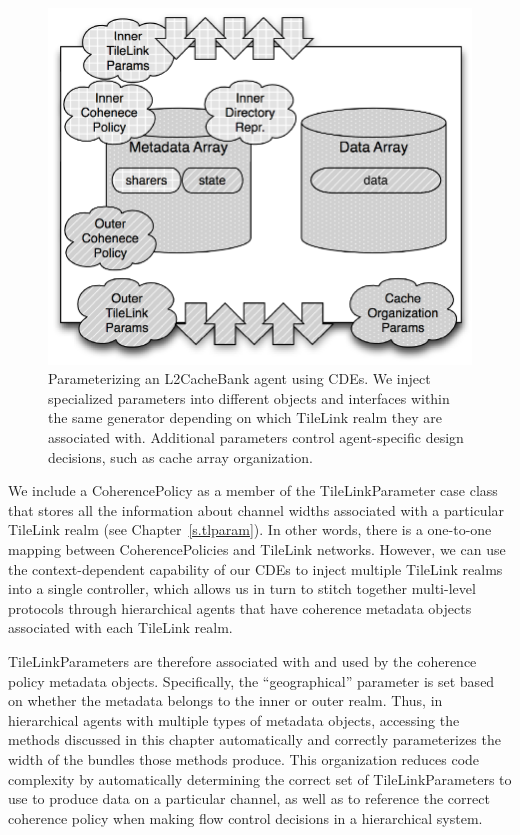 \begin{figure}[t!]
\centering
\includegraphics[width=1\columnwidth]{coherence/figures/cdepolicy.pdf}
\caption[Parameterizing coherence protocol agents with CoherencePolicies.]{
Parameterizing an L2CacheBank agent using CDEs.
We inject specialized parameters into different
objects and interfaces within the same generator depending on which
TileLink realm they are associated with.
Additional parameters control agent-specific design decisions, such as cache array organization.
}
\label{fig:cdepolicy}
\end{figure}

We include a CoherencePolicy as a member of the TileLinkParameter case class that stores all the information
about channel widths associated with a particular TileLink realm (see Chapter~\ref{s.tlparam}).
In other words, there is a one-to-one mapping between CoherencePolicies and TileLink networks.
However, we can use the context-dependent capability of our CDEs to 
inject multiple TileLink realms into a single controller,
which allows us in turn to stitch together multi-level protocols through hierarchical agents
that have coherence metadata objects associated with each TileLink realm.

TileLinkParameters are therefore associated with and used by the coherence policy metadata objects.
Specifically, the ``geographical'' parameter  is set based on whether the metadata belongs to the inner or outer realm.
Thus, in hierarchical agents with multiple types of metadata objects, accessing the methods
discussed in this chapter automatically and correctly parameterizes the width of the bundles those methods produce.
This organization reduces code complexity by automatically determining the correct set of TileLinkParameters to use to produce data on a particular channel,
as well as to reference the correct coherence policy when making flow control decisions in a hierarchical system.

